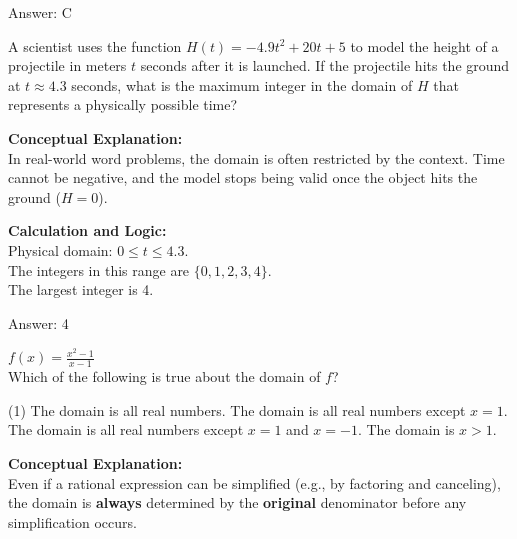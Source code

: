\documentclass[11pt,paper=a4,answers]{exam}
\begin{document}
\begin{questions}
\begin{solution}
\vspace{30pt}

Answer: \colorbox{yellow!100}{C}
\end{solution}

\vspace{40pt}

\question
A scientist uses the function $H(t) = -4.9t^2 + 20t + 5$ to model the height of a projectile in meters $t$ seconds after it is launched. If the projectile hits the ground at $t \approx 4.3$ seconds, what is the maximum integer in the domain of $H$ that represents a physically possible time?

\begin{solution}
\textbf{Conceptual Explanation:} \\
In real-world word problems, the domain is often restricted by the context. Time cannot be negative, and the model stops being valid once the object hits the ground ($H=0$).

\vspace{30pt}

\textbf{Calculation and Logic:} \\
Physical domain: $0 \leq t \leq 4.3$. \\
The integers in this range are $\{0, 1, 2, 3, 4\}$. \\
The largest integer is 4.

\vspace{30pt}

Answer: \colorbox{yellow!100}{4}
\end{solution}

\vspace{40pt}

\question
$f(x) = \frac{x^2 - 1}{x - 1}$ \\
Which of the following is true about the domain of $f$?
\begin{tasks}(1)
    \task The domain is all real numbers.
    \task The domain is all real numbers except $x=1$.
    \task The domain is all real numbers except $x=1$ and $x=-1$.
    \task The domain is $x > 1$.
\end{tasks}

\begin{solution}
\textbf{Conceptual Explanation:} \\
Even if a rational expression can be simplified (e.g., by factoring and canceling), the domain is \textbf{always} determined by the \textbf{original} denominator before any simplification occurs.


\end{solution}
\end{questions}
\end{document}
